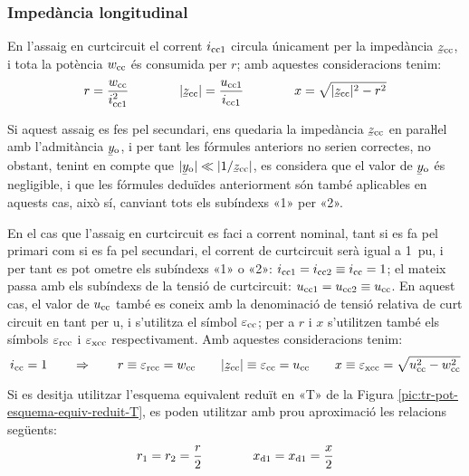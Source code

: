 \subsubsection{Impedància longitudinal}

En l'assaig en curtcircuit el corrent $i_\mathrm{cc1}$ circula
únicament per la impedància $\cmplx{z}\ped{cc}$, i tota la potència
$w_\mathrm{cc}$ és consumida per $r$; amb aquestes consideracions tenim:
\begin{equation}
    r = \frac{w\ped{cc}}{i\ped{cc1}^2} \qquad\qquad
    |\cmplx{z}\ped{cc}| = \frac{u\ped{cc1}}{i\ped{cc1}} \qquad\qquad
    x = \sqrt{|\cmplx{z}\ped{cc}|^2 - r^2}
\end{equation}

Si aquest assaig es fes pel secundari, ens quedaria la impedància
$\cmplx{z}\ped{cc}$ en paraŀlel amb l'admitància
$\cmplx{y}\ped{o}$, i per tant les fórmules anteriors no serien
correctes, no obstant, tenint en compte que $|\cmplx{y}\ped{o}| \ll
|1/\cmplx{z}\ped{cc}|$, es considera que el valor de
$\cmplx{y}\ped{o}$ és negligible, i que les fórmules deduïdes
anteriorment són també aplicables en aquests cas, això sí, canviant
tots els subíndexs «1» per «2».

En el cas que l'assaig en curtcircuit es faci a corrent nominal,
tant  si es fa pel primari  com si es fa pel secundari, el corrent
de curtcircuit serà igual a \SI{1}{pu}, i per tant es pot ometre els
subíndexs «1» o «2»: $i_\mathrm{cc1} = i_\mathrm{cc2} \equiv i_\mathrm{cc} = 1$;
el mateix passa amb els subíndexs de la tensió de curtcircuit:
$u_\mathrm{cc1} = u_\mathrm{cc2} \equiv u_\mathrm{cc}$. En aquest cas, el valor
de $u_\mathrm{cc}$ també es coneix amb la denominació de
tensió relativa de curt  circuit en tant per u, i s'utilitza  el
símbol $\varepsilon_\mathrm{cc}$; per a $r$ i $x$ s'utilitzen també els
símbols $\varepsilon_\mathrm{rcc}$ i $\varepsilon_\mathrm{xcc}$
respectivament. Amb aquestes consideracions tenim:
\begin{equation}
    i\ped{cc} = 1 \qquad \Rightarrow \qquad r \equiv \varepsilon\ped{rcc} = w\ped{cc} \qquad
    |\cmplx{z}\ped{cc}| \equiv \varepsilon\ped{cc} = u\ped{cc} \qquad
    x \equiv \varepsilon\ped{xcc} = \sqrt{u\ped{cc}^2 - w\ped{cc}^2}
    \label{eq:assaig-cc-nomianl}
\end{equation}

Si es desitja utilitzar l'esquema equivalent reduït en «T» de la Figura \vref{pic:tr-pot-esquema-equiv-reduit-T}, es poden utilitzar amb prou aproximació les relacions següents:
\begin{equation}
    r_1 = r_2 = \frac{r}{2} \qquad\qquad x_\mathrm{d1} = x_\mathrm{d1} = \frac{x}{2}
\end{equation}

